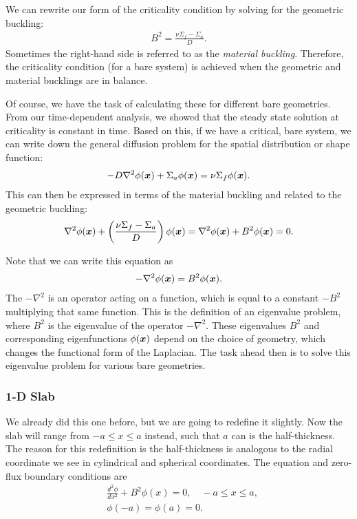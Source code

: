 We can rewrite our form of the criticality condition by solving for the geometric buckling:
\begin{align}
  B^2 = \frac{ \nu \Sigma_f - \Sigma_a }{ D }.
\end{align}
Sometimes the right-hand side is referred to as the \emph{material buckling}. Therefore, the criticality condition (for a bare system) is achieved when the geometric and material bucklings are in balance.

Of course, we have the task of calculating these for different bare geometries. From our time-dependent analysis, we showed that the steady state solution at criticality is constant in time. Based on this, if we have a critical, bare system, we can write down the general diffusion problem for the spatial distribution or shape function:
\begin{align}
  -D \nabla^2 \phi(\bm{x}) + \Sigma_a \phi(\bm{x}) = \nu \Sigma_f \phi(\bm{x}) .
\end{align}
This can then be expressed in terms of the material buckling and related to the geometric buckling:
\begin{align}
  \nabla^2 \phi(\bm{x}) + \left( \frac{ \nu \Sigma_f - \Sigma_a }{ D } \right) \phi(\bm{x}) = \nabla^2 \phi(\bm{x}) + B^2 \phi(\bm{x}) = 0.
\end{align}

Note that we can write this equation as
\begin{align}
  -\nabla^2 \phi(\bm{x}) = B^2 \phi(\bm{x}) . \nonumber
\end{align}
The $-\nabla^2$ is an operator acting on a function, which is equal to a constant $-B^2$ multiplying that same function. This is the definition of an eigenvalue problem, where $B^2$ is the eigenvalue of the operator $-\nabla^2$. These eigenvalues $B^2$ and corresponding eigenfunctions $\phi(\bm{x})$ depend on the choice of geometry, which changes the functional form of the Laplacian. The task ahead then is to solve this eigenvalue problem for various bare geometries. 

\subsubsection{1-D Slab}

We already did this one before, but we are going to redefine it slightly. Now the slab will range from $-a \le x \le a$ instead, such that $a$ can is the half-thickness. The reason for this redefinition is the half-thickness is analogous to the radial coordinate we see in cylindrical and spherical coordinates. The equation and zero-flux boundary conditions are
\begin{subequations}
\begin{align}
  &\frac{d^2 \phi}{dx^2} + B^2 \phi(x) = 0, \quad -a \le x \le a, \\
  &\phi(-a) = \phi(a) = 0.
\end{align}
\end{subequations}

